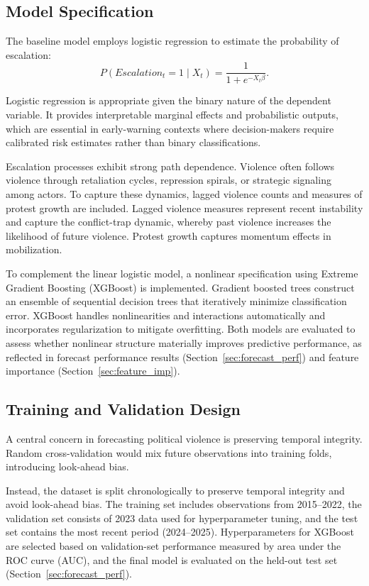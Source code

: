 \documentclass[12pt]{article}
\begin{document}
\subsection{Model Specification}

The baseline model employs logistic regression to estimate the probability of escalation:
$$
P(Escalation_t = 1 \mid X_t) = \frac{1}{1 + e^{-X_t\beta}}.
$$

Logistic regression is appropriate given the binary nature of the dependent variable. It provides interpretable marginal effects and probabilistic outputs, which are essential in early-warning contexts where decision-makers require calibrated risk estimates rather than binary classifications.

Escalation processes exhibit strong path dependence. Violence often follows violence through retaliation cycles, repression spirals, or strategic signaling among actors. To capture these dynamics, lagged violence counts and measures of protest growth are included. Lagged violence measures represent recent instability and capture the conflict-trap dynamic, whereby past violence increases the likelihood of future violence. Protest growth captures momentum effects in mobilization.

To complement the linear logistic model, a nonlinear specification using Extreme Gradient Boosting (XGBoost) is implemented. Gradient boosted trees construct an ensemble of sequential decision trees that iteratively minimize classification error. XGBoost handles nonlinearities and interactions automatically and incorporates regularization to mitigate overfitting. Both models are evaluated to assess whether nonlinear structure materially improves predictive performance, as reflected in forecast performance results (Section~\ref{sec:forecast_perf}) and feature importance (Section~\ref{sec:feature_imp}).

\subsection{Training and Validation Design}

A central concern in forecasting political violence is preserving temporal integrity. Random cross-validation would mix future observations into training folds, introducing look-ahead bias.

Instead, the dataset is split chronologically to preserve temporal integrity and avoid look-ahead bias. The training set includes observations from 2015--2022, the validation set consists of 2023 data used for hyperparameter tuning, and the test set contains the most recent period (2024--2025). Hyperparameters for XGBoost are selected based on validation-set performance measured by area under the ROC curve (AUC), and the final model is evaluated on the held-out test set (Section~\ref{sec:forecast_perf}).
\end{document}
